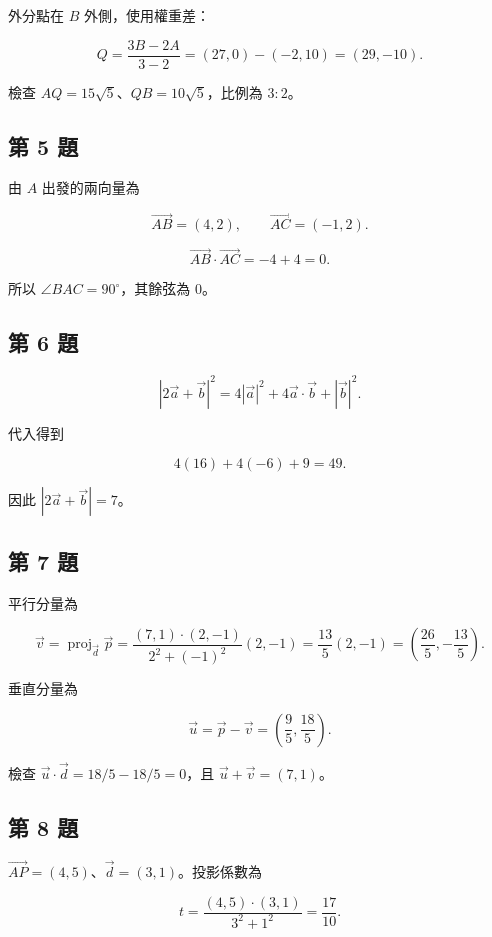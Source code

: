 \documentclass[11pt,a4paper]{article}
\begin{document}
外分點在 \(B\) 外側，使用權重差：

\[
Q=\frac{3B-2A}{3-2}
=(27,0)-(-2,10)=(29,-10).
\]

檢查 \(AQ=15\sqrt5\)、\(QB=10\sqrt5\)，比例為 \(3:2\)。

\subsection{第 5 題}\label{ux7b2c-5-ux984c}

由 \(A\) 出發的兩向量為

\[
\overrightarrow{AB}=(4,2),\qquad \overrightarrow{AC}=(-1,2).
\]

\[
\overrightarrow{AB}\cdot\overrightarrow{AC}=-4+4=0.
\]

所以 \(\angle BAC=90^\circ\)，其餘弦為 \(0\)。

\subsection{第 6 題}\label{ux7b2c-6-ux984c}

\[
|2\vec a+\vec b|^2
=4|\vec a|^2+4\vec a\cdot\vec b+|\vec b|^2.
\]

代入得到

\[
4(16)+4(-6)+9=49.
\]

因此 \(|2\vec a+\vec b|=7\)。

\subsection{第 7 題}\label{ux7b2c-7-ux984c}

平行分量為

\[
\vec v=\operatorname{proj}_{\vec d}\vec p
=\frac{(7,1)\cdot(2,-1)}{2^2+(-1)^2}(2,-1)
=\frac{13}{5}(2,-1)
=\left(\frac{26}{5},-\frac{13}{5}\right).
\]

垂直分量為

\[
\vec u=\vec p-\vec v
=\left(\frac95,\frac{18}{5}\right).
\]

檢查 \(\vec u\cdot\vec d=18/5-18/5=0\)，且 \(\vec u+\vec v=(7,1)\)。

\subsection{第 8 題}\label{ux7b2c-8-ux984c}

\(\overrightarrow{AP}=(4,5)\)、\(\vec d=(3,1)\)。投影係數為

\[
t=\frac{(4,5)\cdot(3,1)}{3^2+1^2}=\frac{17}{10}.
\]
\end{document}
